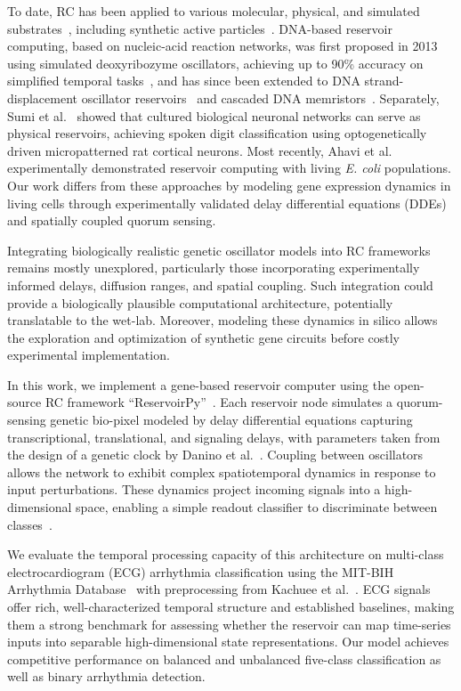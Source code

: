 \documentclass[journal=asbcd6,manuscript=article,keywords]{achemso}
\begin{document}
To date, RC has been applied to various molecular, physical, and simulated substrates~\cite{Tanaka2019}, including synthetic active particles~\cite{Wang2024}. 
DNA-based reservoir computing, based on nucleic-acid reaction networks, was first proposed in 2013 using simulated deoxyribozyme oscillators, achieving up to 90\% accuracy on simplified temporal tasks~\cite{Goudarzi2013}, and has since been extended to DNA strand-displacement oscillator reservoirs~\cite{Liu2022} and cascaded DNA memristors~\cite{Liu2024}. 
Separately, Sumi et al.~\cite{Sumi2023} showed that cultured biological neuronal networks can serve as physical reservoirs, achieving spoken digit classification using optogenetically driven micropatterned rat cortical neurons.
Most recently, Ahavi et al.~\cite{Ahavi2024} experimentally demonstrated reservoir computing with living \textit{E. coli} populations.
Our work differs from these approaches by modeling gene expression dynamics in living cells through experimentally validated delay differential equations (DDEs) and spatially coupled quorum sensing.

Integrating biologically realistic genetic oscillator models into RC frameworks remains mostly unexplored, particularly those incorporating experimentally informed delays, diffusion ranges, and spatial coupling. 
Such integration could provide a biologically plausible computational architecture, potentially translatable to the wet-lab. 
Moreover, modeling these dynamics in silico allows the exploration and optimization of synthetic gene circuits before costly experimental implementation.

In this work, we implement a gene-based reservoir computer using the open-source RC framework ``ReservoirPy''~\cite{Trouvain2020}. 
Each reservoir node simulates a quorum-sensing genetic bio-pixel modeled by delay differential equations capturing transcriptional, translational, and signaling delays, with parameters taken from the design of a genetic clock by Danino et al.~\cite{Danino2010}. 
Coupling between oscillators allows the network to exhibit complex spatiotemporal dynamics in response to input perturbations. 
These dynamics project incoming signals into a high-dimensional space, enabling a simple readout classifier to discriminate between classes~\cite{Maass2002}. 

We evaluate the temporal processing capacity of this architecture on multi-class electrocardiogram (ECG) arrhythmia classification using the MIT-BIH Arrhythmia Database~\cite{Moody2001} with preprocessing from Kachuee et al.~\cite{Kachuee2018}. 
ECG signals offer rich, well-characterized temporal structure and established baselines, making them a strong benchmark for assessing whether the reservoir can map time-series inputs into separable high-dimensional state representations.
Our model achieves competitive performance on balanced and unbalanced five-class classification as well as binary arrhythmia detection.
\end{document}
